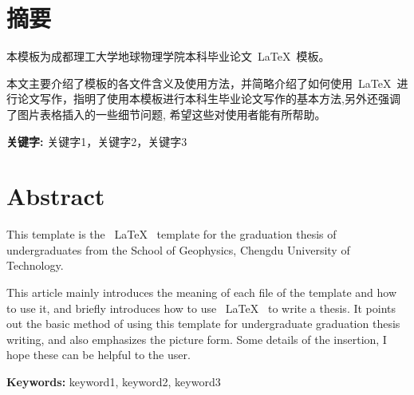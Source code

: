\setcounter{page}{0}						%
\renewcommand{\headrulewidth}{0.5pt} %
\section*{\centering \hei {} 摘\quad 要}
\song {}  %
本模板为成都理工大学地球物理学院本科毕业论文~\LaTeX~模板。

本文主要介绍了模板的各文件含义及使用方法，并简略介绍了如何使用~\LaTeX~进行论文写作，指明了使用本模板进行本科生毕业论文写作的基本方法,另外还强调了图片表格插入的一些细节问题, 希望这些对使用者能有所帮助。

\par 
\mbox{}
\par 
\hei \textbf{关键字:} \song 关键字1，关键字2，关键字3

\newpage
\clearpage
{} %
\section*{\centering {} Abstract}
  
This template is the ~\LaTeX~ template for the graduation thesis of undergraduates from the School of Geophysics, Chengdu University of Technology.

This article mainly introduces the meaning of each file of the template and how to use it, and briefly introduces how to use ~\LaTeX~ to write a thesis. It points out the basic method of using this template for undergraduate graduation thesis writing, and also emphasizes the picture form. Some details of the insertion, I hope these can be helpful to the user.

\par
\mbox{}
\par 
\textbf{Keywords:} keyword1, keyword2, keyword3